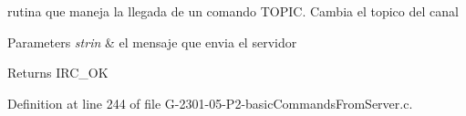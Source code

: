 rutina que maneja la llegada de un comando T\-O\-P\-I\-C. Cambia el topico del canal 


\begin{DoxyParams}{Parameters}
{\em strin} & el mensaje que envia el servidor\\
\hline
\end{DoxyParams}
\begin{DoxyReturn}{Returns}
I\-R\-C\-\_\-\-O\-K 
\end{DoxyReturn}


Definition at line 244 of file G-\/2301-\/05-\/\-P2-\/basic\-Commands\-From\-Server.\-c.

